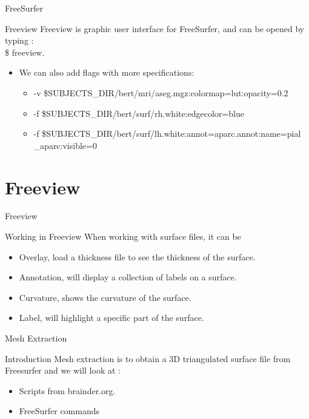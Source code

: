 \documentclass{beamer}
\begin{document}
\begin{frame}{FreeSurfer}
\begin{block}{Freeview}
Freeview is graphic user interface for FreeSurfer, and can be opened by typing :\\

\$ freeview.
\pause
\begin{itemize}
\item<3-> We can also add flags with more specifications:
	\begin{itemize}
	\item<4-> -v  \$SUBJECTS\_DIR/bert/mri/aseg.mgz:colormap=lut:opacity=0.2
	\item<4-> -f  \$SUBJECTS\_DIR/bert/surf/rh.white:edgecolor=blue 
	\item<4->  \small{-f  \$SUBJECTS\_DIR/bert/surf/lh.white:annot=aparc.annot:name=pial \_aparc:visible=0 }
	\end{itemize}
\end{itemize}
\end{block}
\end{frame}

\section{Freeview}
\begin{frame}{Freeview}
\begin{block}{Working in Freeview}
When working with surface files, it can be 
\begin{itemize}
\item<2-> Overlay, load a thickness file to see the thickness of the surface.   
\item<3-> Annotation, will display a collection of labels on a surface.
\item<4-> Curvature, shows the curvature of the surface.
\item<5-> Label, will highlight a specific part of the surface.
\end{itemize}
\end{block}
\end{frame}





\begin{frame}{Mesh Extraction}
\begin{block}{Introduction}
Mesh extraction is to obtain a 3D triangulated surface file from Freesurfer and we will look at :
	\begin{itemize}
	\item<2-> Scripts from brainder.org. %
	\item<3-> FreeSurfer commands	
	\end{itemize}
\end{block}
\end{frame}
\end{document}
